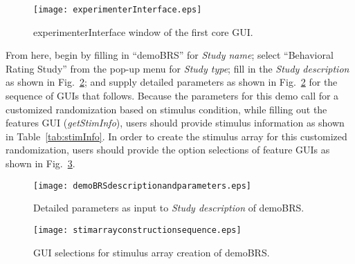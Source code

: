\documentclass[preprint,12pt, a4paper]{elsarticle}
\begin{document}
\begin{figure}[h]
\centering
\texttt{[image: experimenterInterface.eps]}
\caption{experimenterInterface window of the first core GUI.}
\label{fig:gui1ExpInterface}
\end{figure}

From here, begin by filling in ``demoBRS'' for \textit{Study name}; select ``Behavioral Rating Study'' from the pop-up menu for \textit{Study type}; fill in the \textit{Study description} as shown in  Fig.~\ref{fig:demoParameters}; and supply detailed parameters as shown in Fig.~\ref{fig:demoParameters} for the sequence of GUIs that follows. Because the parameters for this demo call for a customized randomization based on stimulus condition, while filling out the features GUI (\textit{getStimInfo}), users should provide stimulus information as shown in Table~\ref{tab:stimInfo}. In order to create the stimulus array for this customized randomization, users should provide the option selections of feature GUIs as shown in Fig.~\ref{fig:stimArraySequence}.


\begin{figure}[ht]
\centering
\texttt{[image: demoBRSdescriptionandparameters.eps]}
\caption{Detailed parameters as input to \textit{Study description} of demoBRS.}
\label{fig:demoParameters}
\end{figure}

\begin{figure}[ht]
\centering
\texttt{[image: stimarrayconstructionsequence.eps]}
\caption{{GUI selections for stimulus array creation of demoBRS.}}
\label{fig:stimArraySequence}
\end{figure}

\end{document}
